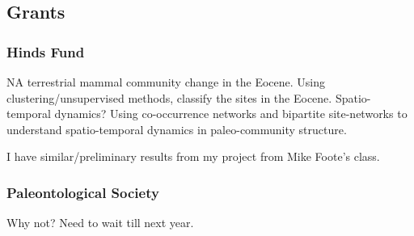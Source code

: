 \documentclass{article}\usepackage{graphicx, color}
\begin{document}
\subsection{Grants}
\subsubsection{Hinds Fund}
 NA terrestrial mammal community change in the Eocene. Using clustering/unsupervised methods, classify the sites in the Eocene. Spatio-temporal dynamics? Using co-occurrence networks and bipartite site-networks to understand spatio-temporal dynamics in paleo-community structure.

I have similar/preliminary results from my project from Mike Foote's class.

\subsubsection{Paleontological Society}
Why not? Need to wait till next year.
\end{document}
